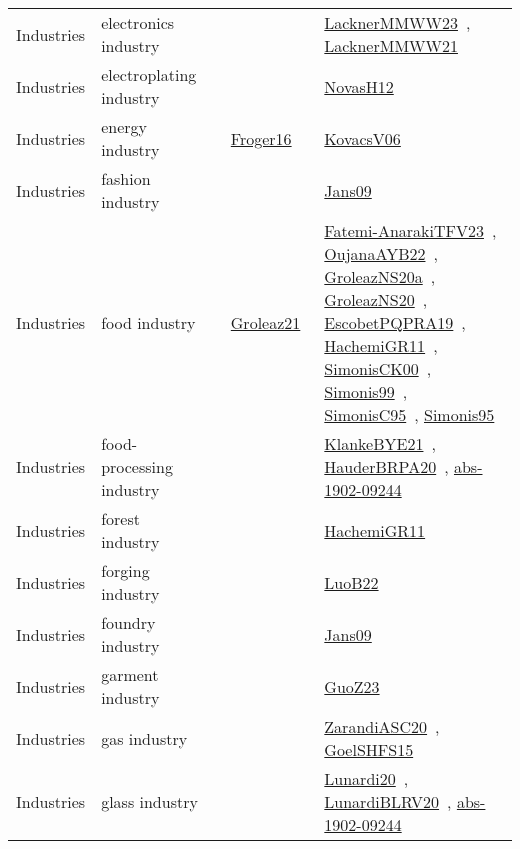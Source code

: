 {\begin{longtable}{lp{3cm}>{\raggedright\arraybackslash}p{6cm}>{\raggedright\arraybackslash}p{6cm}>{\raggedright\arraybackslash}p{8cm}}
Industries & electronics industry &  &  & \href{../works/LacknerMMWW23.pdf}{LacknerMMWW23}~\cite{LacknerMMWW23}, \href{../works/LacknerMMWW21.pdf}{LacknerMMWW21}~\cite{LacknerMMWW21}\\
Industries & electroplating industry &  &  & \href{../works/NovasH12.pdf}{NovasH12}~\cite{NovasH12}\\
Industries & energy industry &  & \href{../works/Froger16.pdf}{Froger16}~\cite{Froger16} & \href{../works/KovacsV06.pdf}{KovacsV06}~\cite{KovacsV06}\\
Industries & fashion industry &  &  & \href{../works/Jans09.pdf}{Jans09}~\cite{Jans09}\\
Industries & food industry &  & \href{../works/Groleaz21.pdf}{Groleaz21}~\cite{Groleaz21} & \href{../works/Fatemi-AnarakiTFV23.pdf}{Fatemi-AnarakiTFV23}~\cite{Fatemi-AnarakiTFV23}, \href{../works/OujanaAYB22.pdf}{OujanaAYB22}~\cite{OujanaAYB22}, \href{../works/GroleazNS20a.pdf}{GroleazNS20a}~\cite{GroleazNS20a}, \href{../works/GroleazNS20.pdf}{GroleazNS20}~\cite{GroleazNS20}, \href{../works/EscobetPQPRA19.pdf}{EscobetPQPRA19}~\cite{EscobetPQPRA19}, \href{../works/HachemiGR11.pdf}{HachemiGR11}~\cite{HachemiGR11}, \href{../works/SimonisCK00.pdf}{SimonisCK00}~\cite{SimonisCK00}, \href{../works/Simonis99.pdf}{Simonis99}~\cite{Simonis99}, \href{../works/SimonisC95.pdf}{SimonisC95}~\cite{SimonisC95}, \href{../works/Simonis95.pdf}{Simonis95}~\cite{Simonis95}\\
Industries & food-processing industry &  &  & \href{../works/KlankeBYE21.pdf}{KlankeBYE21}~\cite{KlankeBYE21}, \href{../works/HauderBRPA20.pdf}{HauderBRPA20}~\cite{HauderBRPA20}, \href{../works/abs-1902-09244.pdf}{abs-1902-09244}~\cite{abs-1902-09244}\\
Industries & forest industry &  &  & \href{../works/HachemiGR11.pdf}{HachemiGR11}~\cite{HachemiGR11}\\
Industries & forging industry &  &  & \href{../works/LuoB22.pdf}{LuoB22}~\cite{LuoB22}\\
Industries & foundry industry &  &  & \href{../works/Jans09.pdf}{Jans09}~\cite{Jans09}\\
Industries & garment industry &  &  & \href{../works/GuoZ23.pdf}{GuoZ23}~\cite{GuoZ23}\\
Industries & gas industry &  &  & \href{../works/ZarandiASC20.pdf}{ZarandiASC20}~\cite{ZarandiASC20}, \href{../works/GoelSHFS15.pdf}{GoelSHFS15}~\cite{GoelSHFS15}\\
Industries & glass industry &  &  & \href{../works/Lunardi20.pdf}{Lunardi20}~\cite{Lunardi20}, \href{../works/LunardiBLRV20.pdf}{LunardiBLRV20}~\cite{LunardiBLRV20}, \href{../works/abs-1902-09244.pdf}{abs-1902-09244}~\cite{abs-1902-09244}\\

\end{longtable}}
